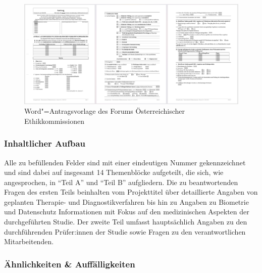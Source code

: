 \documentclass[a4paper,12pt,twoside,numbers=noendperiod]{scrreprt}
\begin{document}
\begin{figure}[ht]
    \centering
    \includegraphics[scale=0.21]{thesis/images/Luidold_Word-Vorlage-Forum-Oesterreichischer-Ethikkommissionen.png}
    \caption[Word"=Antragsvorlage des Forums Österreichischer Ethikkommissionen]{Word"=Antragsvorlage des Forums Österreichischer Ethikkommissionen \cite{ethikkommission_der_medizinischen_universitat_graz_download_2012}}
    \label{fig:dokumentenvorlage-föe}
\end{figure}

\subsubsection*{Inhaltlicher Aufbau}
\label{sub-sub-sec:föe-inhaltlicher-aufbau}

Alle zu befüllenden Felder sind mit einer eindeutigen Nummer gekennzeichnet und sind dabei auf insgesamt 14 Themenblöcke aufgeteilt, die sich, wie angesprochen, in \enquote{Teil A} und \enquote{Teil B} aufgliedern. Die zu beantwortenden Fragen des ersten Teils beinhalten vom Projekttitel über detaillierte Angaben von geplanten Therapie- und Diagnostikverfahren bis hin zu Angaben zu Biometrie und Datenschutz Informationen mit Fokus auf den medizinischen Aspekten der durchgeführten Studie. Der zweite Teil umfasst hauptsächlich Angaben zu den durchführenden Prüfer:innen der Studie sowie Fragen zu den verantwortlichen Mitarbeitenden.

\subsubsection*{Ähnlichkeiten \& Auffälligkeiten}
\label{sub-sub-sec:ähnlichkeiten-auffälligkeiten-föe}
\end{document}
